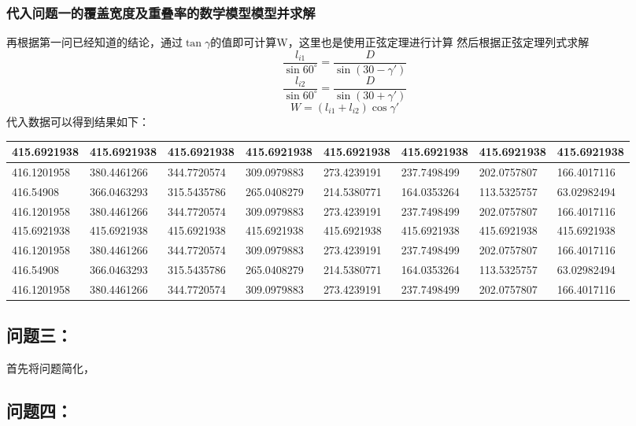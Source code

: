 \documentclass[withoutpreface,bwprint]{cumcmthesis} %
\begin{document}
\subsubsection{代入问题一的覆盖宽度及重叠率的数学模型模型并求解}
再根据第一问已经知道的结论，通过$\tan\gamma$的值即可计算W，这里也是使用正弦定理进行计算
然后根据正弦定理列式求解
$$
\frac{l_{i1}}{\sin 60^{\circ}}=\frac{D}{\sin \left( 30-\gamma \prime \right)}
$$ 
$$
\frac{l_{i2}}{\sin 60^{\circ}}=\frac{D}{\sin \left( 30+\gamma \prime \right)}
$$ 
$$
W=\left( l_{i1}+l_{i2} \right) \cos \gamma \prime
$$ 
代入数据可以得到结果如下：
\begin{table}[!ht]
    \centering
    \begin{tabular}{|l|l|l|l|l|l|l|l|}
    \hline
        415.6921938 & 415.6921938 & 415.6921938 & 415.6921938 & 415.6921938 & 415.6921938 & 415.6921938 & 415.6921938 \\ \hline
        416.1201958 & 380.4461266 & 344.7720574 & 309.0979883 & 273.4239191 & 237.7498499 & 202.0757807 & 166.4017116 \\ \hline
        416.54908 & 366.0463293 & 315.5435786 & 265.0408279 & 214.5380771 & 164.0353264 & 113.5325757 & 63.02982494 \\ \hline
        416.1201958 & 380.4461266 & 344.7720574 & 309.0979883 & 273.4239191 & 237.7498499 & 202.0757807 & 166.4017116 \\ \hline
        415.6921938 & 415.6921938 & 415.6921938 & 415.6921938 & 415.6921938 & 415.6921938 & 415.6921938 & 415.6921938 \\ \hline
        416.1201958 & 380.4461266 & 344.7720574 & 309.0979883 & 273.4239191 & 237.7498499 & 202.0757807 & 166.4017116 \\ \hline
        416.54908 & 366.0463293 & 315.5435786 & 265.0408279 & 214.5380771 & 164.0353264 & 113.5325757 & 63.02982494 \\ \hline
        416.1201958 & 380.4461266 & 344.7720574 & 309.0979883 & 273.4239191 & 237.7498499 & 202.0757807 & 166.4017116 \\ \hline
    \end{tabular}
\end{table}
\subsection{问题三：}
首先将问题简化，

\subsection{问题四：}
\end{document}
